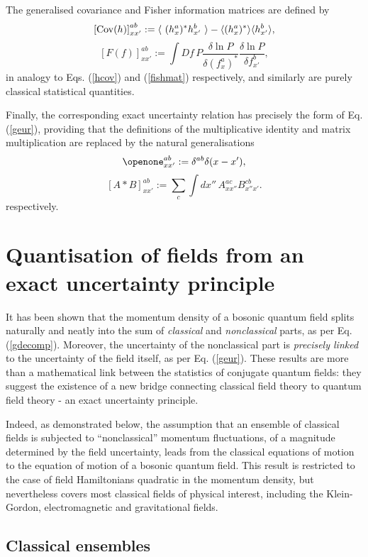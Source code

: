 \documentclass[a4paper,preprint, showpacs, aps, draft]{revtex4}
\begin{document}
{The generalised covariance and Fisher information matrices are defined
by 
\begin{equation}
\left[{\rm Cov}(h)\right]^{ab}_{xx'} := \langle~(h^a_x)^*h^b_{x'}~\rangle
- \langle(h^a_x)^*\rangle \langle h^b_{x'}\rangle ,
\end{equation}
\begin{equation}
\left[ F(f)\right]^{ab}_{xx'} :=
\int D\! f\, P\frac{\delta\ln P}{\delta(f^a_x)^*}
\frac{\delta\ln P}{\delta f^b_{x'}} , 
\end{equation}
in analogy to Eqs. (\ref{hcov}) and (\ref{fishmat}) respectively, and
similarly are purely classical statistical quantities.

Finally, the corresponding exact uncertainty relation has precisely the
form of Eq. (\ref{geur}), providing that the definitions of the 
multiplicative identity and matrix multiplication are replaced by the
natural generalisations 
\[
\openone^{ab}_{xx'} := \delta^{ab}\delta(x-x') ,\]
\[
\left[ A\ast B\right]^{ab}_{xx'} := \sum_c\int dx''\, A^{ac}_{xx''}
B^{cb}_{x''x'} .\]
respectively.

\section{Quantisation of fields from an exact uncertainty principle}

It has been shown that the momentum density of a
bosonic quantum field splits naturally and neatly into the sum of {\it
classical} and {\it nonclassical} parts, as per Eq. (\ref{gdecomp}).
Moreover, the uncertainty of the nonclassical part is {\it precisely
linked} to the uncertainty of the field itself, as per Eq. (\ref{geur}).
These results are more than a mathematical link between the
statistics of conjugate quantum fields:  they suggest the existence of a
new bridge connecting classical field theory to quantum field theory - an
exact uncertainty principle.

Indeed, as demonstrated below, the assumption that an ensemble
of classical fields is subjected to ``nonclassical'' momentum
fluctuations, of a magnitude determined by the field uncertainty, leads
from the classical equations of motion to the equation of motion  of a
bosonic quantum field.  This result is restricted to the case of
field Hamiltonians quadratic in the momentum density, but nevertheless 
covers most classical fields of physical interest, including the
Klein-Gordon, electromagnetic and gravitational fields.

\subsection{Classical ensembles}

}
\end{document}
